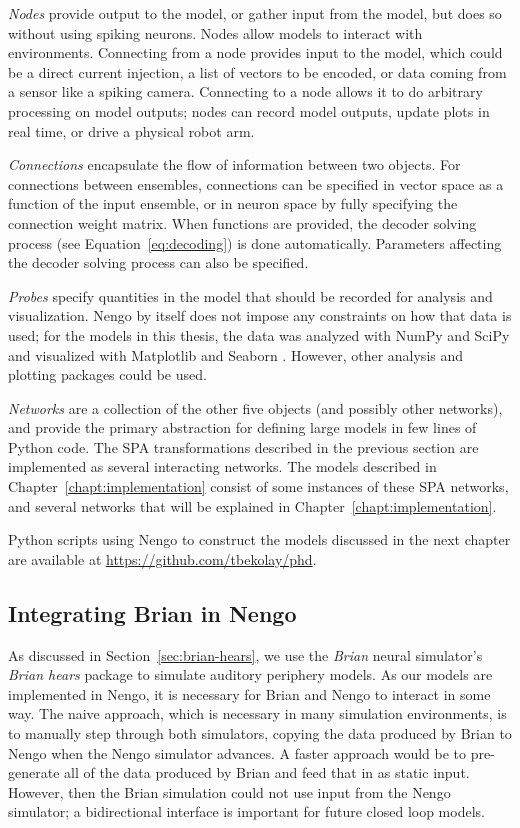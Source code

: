 \textit{Nodes} provide output
to the model, or gather input from the model,
but does so without using spiking neurons.
Nodes allow models to interact with environments.
Connecting from a node provides input
to the model, which could be
a direct current injection,
a list of vectors to be encoded,
or data coming from a sensor
like a spiking camera.
Connecting to a node allows it
to do arbitrary processing on
model outputs;
nodes can record model outputs,
update plots in real time,
or drive a physical robot arm.

\textit{Connections} encapsulate
the flow of information between two objects.
For connections between ensembles,
connections can be specified in vector space
as a function of the input ensemble,
or in neuron space
by fully specifying the connection weight matrix.
When functions are provided,
the decoder solving process
(see Equation~\eqref{eq:decoding})
is done automatically.
Parameters affecting
the decoder solving process
can also be specified.

\textit{Probes} specify quantities
in the model that should be recorded
for analysis and visualization.
Nengo by itself does not
impose any constraints on how
that data is used;
for the models in this thesis,
the data was analyzed with
NumPy \citep{vanderwalt2011}
and SciPy \citep{jones2015}
and visualized with
Matplotlib \citep{hunter2007}
and Seaborn \citep{waskom2014}.
However, other analysis and plotting packages
could be used.

\textit{Networks} are a collection of
the other five objects
(and possibly other networks),
and provide the primary abstraction
for defining large models
in few lines of Python code.
The SPA transformations
described in the previous section
are implemented as several
interacting networks.
The models described
in Chapter~\ref{chapt:implementation} consist
of some instances of
these SPA networks,
and several networks
that will be explained
in Chapter~\ref{chapt:implementation}.

Python scripts using Nengo to construct
the models discussed in the next chapter
are available at \url{https://github.com/tbekolay/phd}.

\subsection{Integrating Brian in Nengo}

As discussed in Section~\ref{sec:brian-hears},
we use the \textit{Brian} neural simulator's
\textit{Brian hears} package
to simulate auditory periphery models.
As our models are implemented in Nengo,
it is necessary for Brian and Nengo
to interact in some way.
The naive approach,
which is necessary in many simulation environments,
is to manually step through both simulators,
copying the data produced by Brian
to Nengo when the Nengo simulator advances.
A faster approach would be to
pre-generate all of the data
produced by Brian
and feed that in as
static input.
However,
then the Brian simulation could not
use input from the Nengo simulator;
a bidirectional interface
is important for future closed loop models.

